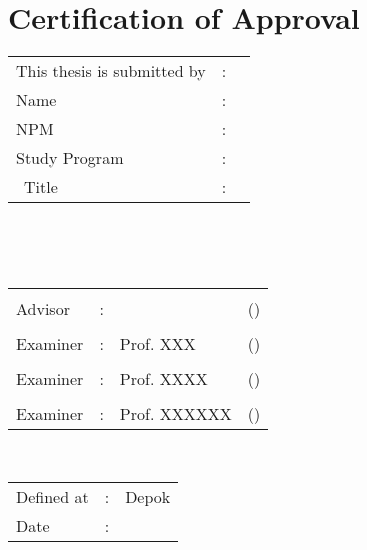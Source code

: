 %
%
%

\chapter*{Certification of Approval}

\vspace*{0.4cm}
\noindent 

\noindent
\begin{tabular}{ll p{9cm}}
	This thesis is submitted by&: & \\
	Name&: & \penulis \\
	NPM&: & \npm \\
	Study Program&: & \program \\
	\type~Title&: & \judul \\
\end{tabular} \\

\vspace*{1.0cm}

\noindent {}\\[0.2cm]

\begin{center}
\end{center}

\vspace*{0.3cm}

\begin{tabular}{l l l l }
	& & & \\
	Advisor&: & \pembimbing & (\hspace*{3.0cm}) \\
	& & & \\
	Examiner&: & Prof. XXX & (\hspace*{3.0cm}) \\
	& & & \\
	Examiner&: & Prof. XXXX & (\hspace*{3.0cm}) \\
	& & & \\
	Examiner&: & Prof. XXXXXX & (\hspace*{3.0cm}) \\
\end{tabular}\\


\vspace*{2.0cm}

\begin{tabular}{ll l}
	Defined at&: & Depok\\
	Date&: & \tanggalLulus \\
\end{tabular}


\newpage
